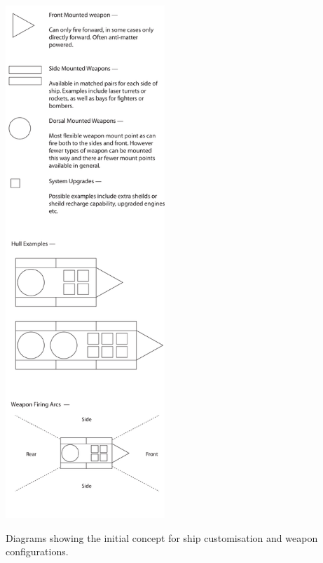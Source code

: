\begin{marginfigure}
	\includegraphics[width=6cm]{res/design/ship_design}
	\caption[Diagrams showing the initial concept for ship customisation]{Diagrams showing the initial concept for ship customisation and weapon configurations.}
	\label{fig:ship_design}
\end{marginfigure}

